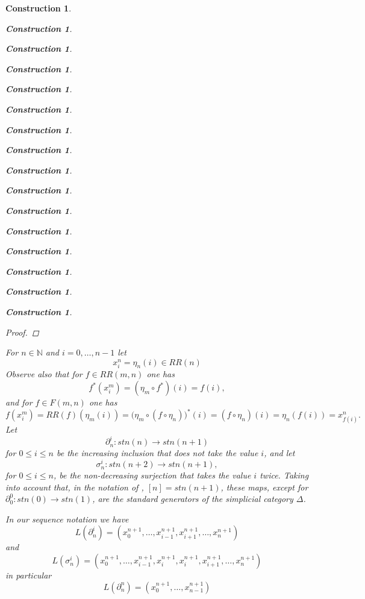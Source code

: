 \documentclass[onecolumn,12pt]{amsart}
\numberwithin{proposition}{subsection}
\newtheorem{construction}[proposition]{Construction}
\newcommand{\sr}{\rightarrow}
\newcommand{\nn}{{\mathbb N}}
\newcommand{\nat}{\nn}
\newcommand{\mbind}[1]{{#1^*}}
\begin{document}
\begin{construction}
\begin{construction}
\begin{construction}
\begin{construction}
\begin{construction}
\begin{construction}
\begin{construction}
\begin{construction}
\begin{construction}
\begin{construction}
\begin{construction}
\begin{construction}
\begin{construction}
\begin{construction}
\begin{construction}
\begin{construction}
\begin{proof}
\end{proof}
%
For $n\in\nat$ and $i=0,\dots,n-1$ let
%
$$x_i^n=\eta_{n}(i)\in RR(n)$$
%
Observe also that for $f\in RR(m,n)$ one has
%
\begin{equation}\label{2015.08.24.eq5}
\mbind{f}(x_i^m)=(\eta_{m}\circ\mbind{f})(i)=f(i),
\end{equation}%
%
and for $f\in F(m,n)$ one has
%
\begin{equation}\label{2016.01.15.eq1}
f(x_i^m)=RR(f)(\eta_{m}(i))=(\eta_{m}\circ \mbind{(f\circ \eta_{n}))}(i)=(f\circ \eta_{n})(i)=\eta_{n}(f(i))=x_{f(i)}^n.
\end{equation}%
%
Let 
%
$$\partial^{i}_{n}:stn(n)\sr stn(n+1)$$
%
for $0\le i\le n$ be the increasing inclusion that does not take the value $i$, and let
%
$$\sigma^{i}_{n}:stn(n+2)\sr stn(n+1),$$
%
for $0\le i\le n$, be the non-decreasing surjection that takes the value $i$
twice. Taking into account that, in the notation of \cite{GabZis},
$[n]=stn(n+1)$, these maps, except for $\partial^0_0:stn(0)\sr stn(1)$, are the standard generators of the simplicial category
$\Delta$.

In our sequence notation we have
%
\begin{equation}\label{2015.08.24.eq7}
L(\partial^{i}_{n})=(x_0^{n+1},\dots,x_{i-1}^{n+1},x_{i+1}^{n+1},\dots,x_n^{n+1})
\end{equation}%
%
and
%
\begin{equation}\label{2015.08.24.eq8}
L(\sigma^{i}_{n})=(x_0^{n+1},\dots,x_{i-1}^{n+1},x_i^{n+1},x_i^{n+1},x_{i+1}^{n+1},\dots,x_n^{n+1})
\end{equation}%
%
in particular
%
\begin{equation}\label{2015.07.12.eq5}
L(\partial^{n}_n)=(x_0^{n+1},\dots,x_{n-1}^{n+1})
\end{equation}%
%


\end{construction}
\end{construction}
\end{construction}
\end{construction}
\end{construction}
\end{construction}
\end{construction}
\end{construction}
\end{construction}
\end{construction}
\end{construction}
\end{construction}
\end{construction}
\end{construction}
\end{construction}
\end{construction}
\end{document}
